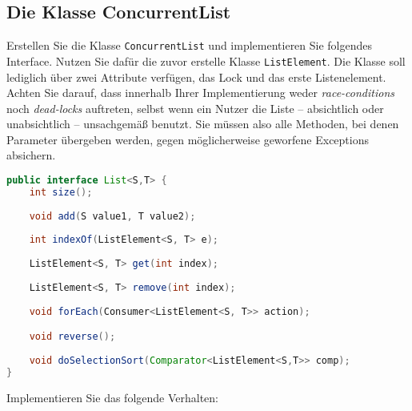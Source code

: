 \documentclass[11pt]{article} %
\begin{document}
\subsection{Die Klasse ConcurrentList}
Erstellen Sie die Klasse \texttt{ConcurrentList} und implementieren Sie folgendes Interface. Nutzen Sie dafür die zuvor erstelle Klasse \texttt{ListElement}. Die Klasse soll lediglich über zwei Attribute verfügen, das Lock und das erste Listenelement. Achten Sie darauf, dass innerhalb Ihrer Implementierung weder \emph{race-conditions} noch \emph{dead-locks} auftreten, selbst wenn ein Nutzer die Liste \linebreak[2] – absichtlich oder unabsichtlich – unsachgemäß benutzt. Sie müssen also alle Methoden, bei denen Parameter übergeben werden, gegen möglicherweise geworfene Exceptions absichern.
\begin{lstlisting}[language=Java]
public interface List<S,T> {
	int size();
	
	void add(S value1, T value2);
	
	int indexOf(ListElement<S, T> e);
	
	ListElement<S, T> get(int index); 
	
	ListElement<S, T> remove(int index);
	
	void forEach(Consumer<ListElement<S, T>> action);

	void reverse();
	
	void doSelectionSort(Comparator<ListElement<S,T>> comp);
}
\end{lstlisting}
Implementieren Sie das folgende Verhalten:
\end{document}
